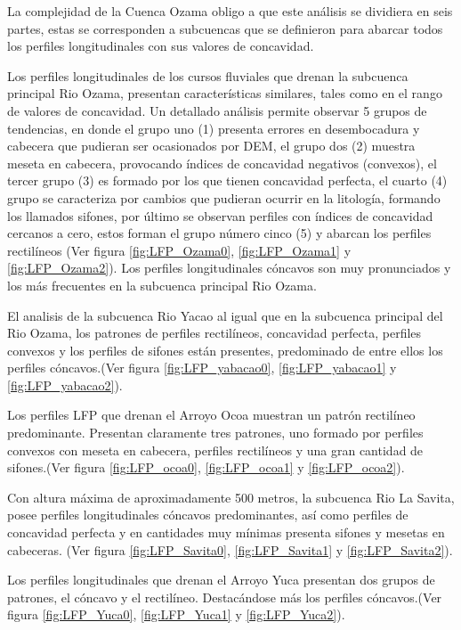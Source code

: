 \documentclass[11pt,]{article}
\begin{document}
La complejidad de la Cuenca Ozama obligo a que este análisis se
dividiera en seis partes, estas se corresponden a subcuencas que se
definieron para abarcar todos los perfiles longitudinales con sus
valores de concavidad.

Los perfiles longitudinales de los cursos fluviales que drenan la
subcuenca principal Rio Ozama, presentan características similares,
tales como en el rango de valores de concavidad. Un detallado análisis
permite observar 5 grupos de tendencias, en donde el grupo uno (1)
presenta errores en desembocadura y cabecera que pudieran ser
ocasionados por DEM, el grupo dos (2) muestra meseta en cabecera,
provocando índices de concavidad negativos (convexos), el tercer grupo
(3) es formado por los que tienen concavidad perfecta, el cuarto (4)
grupo se caracteriza por cambios que pudieran ocurrir en la litología,
formando los llamados sifones, por último se observan perfiles con
índices de concavidad cercanos a cero, estos forman el grupo número
cinco (5) y abarcan los perfiles rectilíneos (Ver figura
\ref{fig:LFP_Ozama0}, \ref{fig:LFP_Ozama1} y \ref{fig:LFP_Ozama2}). Los
perfiles longitudinales cóncavos son muy pronunciados y los más
frecuentes en la subcuenca principal Rio Ozama.

El analisis de la subcuenca Rio Yacao al igual que en la subcuenca
principal del Rio Ozama, los patrones de perfiles rectilíneos,
concavidad perfecta, perfiles convexos y los perfiles de sifones están
presentes, predominado de entre ellos los perfiles cóncavos.(Ver figura
\ref{fig:LFP_yabacao0}, \ref{fig:LFP_yabacao1} y
\ref{fig:LFP_yabacao2}).

Los perfiles LFP que drenan el Arroyo Ocoa muestran un patrón rectilíneo
predominante. Presentan claramente tres patrones, uno formado por
perfiles convexos con meseta en cabecera, perfiles rectilíneos y una
gran cantidad de sifones.(Ver figura \ref{fig:LFP_ocoa0},
\ref{fig:LFP_ocoa1} y \ref{fig:LFP_ocoa2}).

Con altura máxima de aproximadamente 500 metros, la subcuenca Rio La
Savita, posee perfiles longitudinales cóncavos predominantes, así como
perfiles de concavidad perfecta y en cantidades muy mínimas presenta
sifones y mesetas en cabeceras. (Ver figura \ref{fig:LFP_Savita0},
\ref{fig:LFP_Savita1} y \ref{fig:LFP_Savita2}).

Los perfiles longitudinales que drenan el Arroyo Yuca presentan dos
grupos de patrones, el cóncavo y el rectilíneo. Destacándose más los
perfiles cóncavos.(Ver figura \ref{fig:LFP_Yuca0}, \ref{fig:LFP_Yuca1} y
\ref{fig:LFP_Yuca2}).
\end{document}
